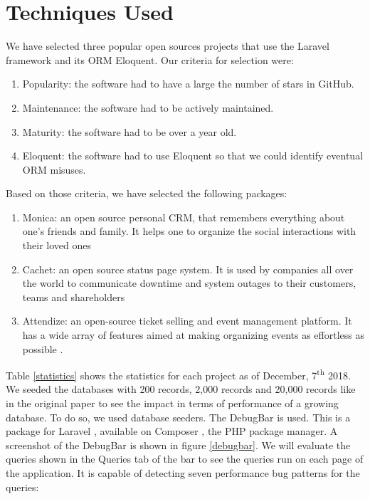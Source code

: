 \documentclass[sigconf]{acmart}
\begin{document}
\section{Techniques Used}
We have selected three popular open sources projects that use the Laravel framework and its ORM Eloquent. Our criteria for selection were:
\begin{enumerate}
\item Popularity: the software had to have a large the number of stars in GitHub.
\item Maintenance: the software had to be actively maintained.
\item Maturity: the software had to be over a year old.
\item Eloquent: the software had to use Eloquent so that we could identify eventual ORM misuses.
\end{enumerate}
\noindent Based on those criteria, we have selected the following packages:
\begin{enumerate}
\item Monica: an open source personal CRM, that remembers everything about one's friends and family. It helps one to organize the social interactions with their loved ones \cite{monica}
\item Cachet: an open source status page system. It is used by companies all over the world to communicate downtime and system outages to their customers, teams and shareholders \cite{cachet}
\item Attendize: an open-source ticket selling and event management platform. It has a wide array of features aimed at making organizing events as effortless as possible \cite{attendize}.
\end{enumerate}
\noindent Table \ref{statistics} shows the statistics for each project as of December, 7\textsuperscript{th} 2018. We seeded the databases with 200 records, 2,000 records and 20,000 records like in the original paper to see the impact in terms of performance of a growing database. To do so, we used database seeders. The DebugBar \cite{debugbar} is used. This is a package for Laravel \cite{laravel}, available on Composer \cite{debugbarpackage}, the PHP package manager. A screenshot of the DebugBar is shown in figure \ref{debugbar}. We will evaluate the queries shown in the Queries tab of the bar to see the queries run on each page of the application. It is capable of detecting seven performance bug patterns for the queries:
\end{document}
